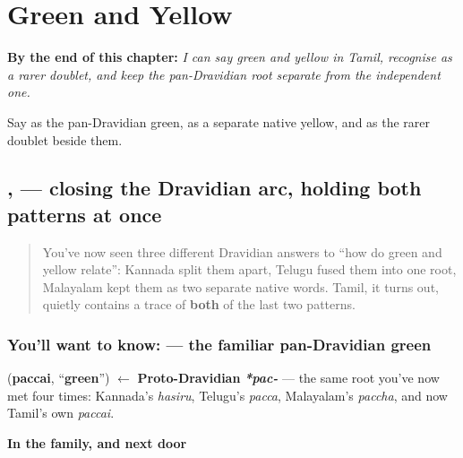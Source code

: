 
\chapter{Green and Yellow}
\label{ch:ta-green-and-yellow}

\begin{chapteropening}
\textbf{By the end of this chapter:} \emph{I can say green and yellow in Tamil, recognise  as a rarer doublet, and keep the pan-Dravidian root separate from the independent one.}

Say  as the pan-Dravidian green,  as a separate native yellow, and  as the rarer doublet beside them.
\end{chapteropening}

\section[\texorpdfstring{\ta{பச்சை}, \ta{மஞ்சள்} (paccai mañcaḷ)}{பச்சை, மஞ்சள் (paccai mañcaḷ)}]{,  — closing the Dravidian arc, holding both patterns at once}

\label{lesson:TA-C22-paccai-manjal}



\begin{quote}
You've now seen three different Dravidian answers to \textquotedblleft{}how do green and yellow relate\textquotedblright{}: Kannada split them apart, Telugu fused them into one root, Malayalam kept them as two separate native words. Tamil, it turns out, quietly contains a trace of \textbf{both} of the last two patterns.
\end{quote}

\subsection*{You'll want to know:  — the familiar pan-Dravidian green}
\textbf{} (\textbf{paccai}, \textquotedblleft{}\textbf{green}\textquotedblright{}) $\leftarrow$ \textbf{Proto-Dravidian} \emph{\textbf{*pac-}} — the same root you've now met four times: Kannada's \emph{hasiru}, Telugu's \emph{pacca}, Malayalam's \emph{paccha}, and now Tamil's own \emph{paccai}.

\textbf{In the family, and next door}


